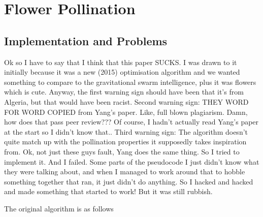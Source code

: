 \section{Flower Pollination}
\subsection{Implementation and Problems}

Ok so I have to say that I think that this paper\cite{7175923} SUCKS. I was drawn to it initially because it was a new (2015) optimisation algorithm and we wanted something to compare to the gravitational swarm intelligence\cite{bib:GravSwarm}, plus it was flowers which is cute.
Anyway, the first warning sign should have been that it's from Algeria, but that would have been racist. Second warning sign: THEY WORD FOR WORD COPIED from Yang's paper. Like, full blown plagiarism. Damn, how does that pass peer review??? Of course, I hadn't actually read Yang's paper at the start so I didn't know that.. Third warning sign: The algorithm doesn't quite match up with the pollination properties it supposedly takes inspiration from. Ok, not just these guys fault, Yang does the same thing.
So I tried to implement it. And I failed. Some parts of the pseudocode I just didn't know what they were talking about, and when I managed to work around that to hobble something together that ran, it just didn't do anything. So I hacked and hacked and made something that started to work! But it was still rubbish.

The original algorithm is as follows


